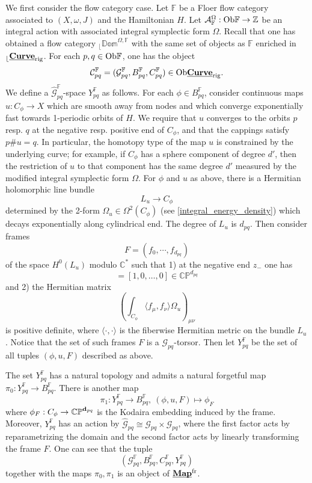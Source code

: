 \documentclass[reqno, 10pt]{amsart}
\numberwithin{equation}{section}
\numberwithin{equation}{section}
\theoremstyle{definition}
\theoremstyle{remark}
\newcommand{\beqn}{\begin{equation*}}
\newcommand{\eeqn}{\end{equation*}}
\newcommand{\mb}{\mathbb}
\newcommand{\mc}{\mathcal}
\renewcommand{\outer}{{}_{\lfloor}}
\newcommand{\uds}[1]{\underline{\smash{#1}}}
\begin{document}
We first consider the flow category case. Let ${\mb F}$ be a Floer flow category associated to $(X, \omega, J)$ and the Hamiltonian $H$. Let ${\mc A}_{\mb F}^\Omega: {\rm Ob}{\mb F} \to {\mb Z}$ be an integral action with associated integral symplectic form $\Omega$. Recall that one has obtained a flow category $\outer \mb{Dom}^{\Omega, {\mb F}}$ with the same set of objects as ${\mb F}$ enriched in $\outer \uds{\bf Curve}_{\rm rig}$. For each $p, q \in {\rm Ob}{\mb F}$, one has the object
\beqn
{\mc C}_{pq}^{\mb F} = ({\mc G}_{pq}^{\mb F}, B_{pq}^{\mb F}, C_{pq}^{\mb F}) \in {\rm Ob} \uds{\bf Curve}_{\rm rig}.
\eeqn
We define a $\hat{\mc G}_{pq}^{\mb F}$-space $Y_{pq}^{\mb F}$ as follows. For each $\phi \in B_{pq}^{\mb F}$, consider continuous maps $u: C_\phi \to X$ which are smooth away from nodes and which converge exponentially fast towards 1-periodic orbits of $H$. We require that $u$ converges to the orbits $p$ resp. $q$ at the negative resp. positive end of $C_\phi$, and that the cappings satisfy $p \# u = q$. In particular, the homotopy type of the map $u$ is constrained by the underlying curve; for example, if $C_\phi$ has a sphere component of degree $d'$, then the restriction of $u$ to that component has the same degree $d'$ measured by the modified integral symplectic form $\Omega$. For $\phi$ and $u$ as above, there is a Hermitian holomorphic line bundle
\beqn
L_u  \to C_\phi
\eeqn
determined by the 2-form $\Omega_u \in \Omega^2(C_\phi)$ (see \eqref{integral_energy_density}) which decays exponentially along cylindrical end. The degree of $L_u$ is $d_{pq}$. Then consider frames 
\beqn
F = (f_0, \cdots, f_{d_{pq}})
\eeqn
of the space $H^0(L_u)$ modulo ${\mb C}^*$ such that 1) at the negative end $z_-$ one has 
\beqn
[f_0(z_-), \ldots, f_{d_{pq}}(z_-)] = [1, 0, \ldots, 0] \in \mb{CP}^{d_{pq}}
\eeqn
and 2) the Hermitian matrix
\beqn
\left( \int_{C_\phi} \langle f_\mu, f_\nu \rangle \Omega_u \right)_{\mu\nu}
\eeqn
is positive definite, where $\langle \cdot , \cdot \rangle$ is the fiberwise Hermitian metric on the bundle $L_u$. Notice that the set of  such frames $F$ is a ${\mc G}_{pq}$-torsor. Then let $Y_{pq}^{\mb F}$ be the set of all tuples $(\phi, u, F)$ described as above. 

The set $Y_{pq}^{\mb F}$ has a natural topology and admits a natural forgetful map $\pi_0: Y_{pq}^{\mb F} \to B_{pq}^{\mb F}$. There is another map
\beqn
\pi_1: Y_{pq}^{\mb F} \to B_{pq}^{\mb F},\ (\phi, u, F) \mapsto \phi_F 
\eeqn
where $\phi_F: C_\phi \to \mb{CP}^{{\bf d}_{pq}}$ is the Kodaira embedding induced by the frame. Moreover, $Y_{pq}^{\mb F}$ has an action by $\hat {\mc G}_{pq} \cong {\mc G}_{pq} \times {\mc G}_{pq}$, where the first factor acts by reparametrizing the domain and the second factor acts by linearly transforming the frame $F$. One can see that the tuple
\beqn
({\mc G}_{pq}^{\mb F}, B_{pq}^{\mb F}, C_{pq}^{\mb F}, Y_{pq}^{\mb F})
\eeqn
together with the maps $\pi_0, \pi_1$ is an object of $\uds{\bf Map}^{\rm fr}$. 
\end{document}
